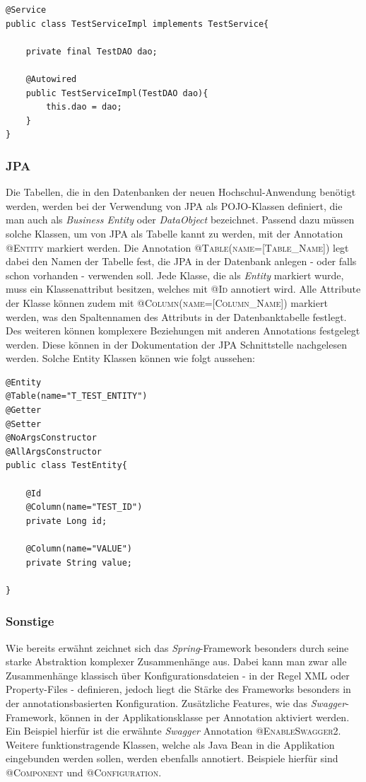 \begin{lstlisting}[caption={Spring Service Klasse}]
@Service
public class TestServiceImpl implements TestService{

    private final TestDAO dao;

    @Autowired
    public TestServiceImpl(TestDAO dao){
        this.dao = dao;
    }
} 
\end{lstlisting}

\subsubsection*{JPA}

Die Tabellen, die in den Datenbanken der neuen Hochschul-Anwendung benötigt werden, werden bei der Verwendung von \ac{JPA} als \ac{POJO}-Klassen definiert, die man auch als \textit{Business Entity} oder \textit{DataObject} bezeichnet. Passend dazu müssen solche Klassen, um von \ac{JPA} als Tabelle kannt zu werden, mit der Annotation \textsc{@Entity} markiert werden. Die Annotation \textsc{@Table(name=[Table_Name])} legt dabei den Namen der Tabelle fest, die \ac{JPA} in der Datenbank anlegen - oder falls schon vorhanden - verwenden soll. Jede Klasse, die als \textit{Entity} markiert wurde, muss ein Klassenattribut besitzen, welches mit \textsc{@Id} annotiert wird. Alle Attribute der Klasse können zudem mit \textsc{@Column(name=[Column_Name])} markiert werden, was den Spaltennamen des Attributs in der Datenbanktabelle festlegt. Des weiteren können komplexere Beziehungen mit anderen Annotations festgelegt werden. Diese können in der Dokumentation der \ac{JPA} Schnittstelle nachgelesen werden\autocite[][]{jpa_oracle}. Solche Entity Klassen können wie folgt aussehen:

\begin{lstlisting}[caption={Spring Entity Klasse}]
@Entity
@Table(name="T_TEST_ENTITY")
@Getter
@Setter
@NoArgsConstructor
@AllArgsConstructor
public class TestEntity{

    @Id
    @Column(name="TEST_ID")
    private Long id;

    @Column(name="VALUE")
    private String value;
    
} 
\end{lstlisting}

\subsubsection*{Sonstige}

Wie bereits erwähnt zeichnet sich das \textit{Spring}-Framework besonders durch seine starke Abstraktion komplexer Zusammenhänge aus. Dabei kann man zwar alle Zusammenhänge klassisch über Konfigurationsdateien - in der Regel \ac{XML} oder Property-Files - definieren, jedoch liegt die Stärke des Frameworks besonders in der annotationsbasierten Konfiguration. Zusätzliche Features, wie das \textit{Swagger}-Framework, können in der Applikationsklasse per Annotation aktiviert werden. Ein Beispiel hierfür ist die erwähnte \textit{Swagger} Annotation \textsc{@EnableSwagger2}. Weitere funktionstragende Klassen, welche als Java Bean in die Applikation eingebunden werden sollen, werden ebenfalls annotiert. Beispiele hierfür sind \textsc{@Component} und \textsc{@Configuration}. 

